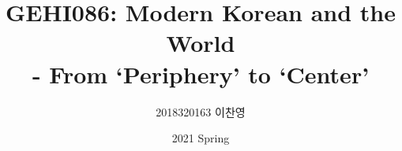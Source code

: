 

\title{GEHI086: Modern Korean and the World\\ - From `Periphery' to `Center'}
\author{2018320163 이찬영}
\date{2021 Spring}


    \maketitle
    \tableofcontents
    
    
    
    
    
    
    
    

